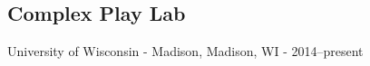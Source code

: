 \documentclass[../main.tex]{subfiles}
\begin{document}
\subsection*{Complex Play Lab}
	University of Wisconsin - Madison, Madison, WI - 2014--present
\end{document}
